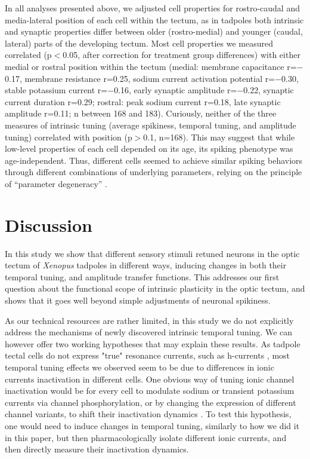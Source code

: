 \documentclass{article}
\begin{document}
In all analyses presented above, we adjusted cell properties for rostro-caudal and media-lateral position of each cell within the tectum, as in tadpoles both intrinsic \citep{hamodi2014} and synaptic properties \citep{wu1996,khakhalin2012} differ between older (rostro-medial) and younger (caudal, lateral) parts of the developing tectum. Most cell properties we measured correlated (p$<$0.05, after correction for treatment group differences) with either medial or rostral position within the tectum (medial: membrane capacitance r=$-$0.17, membrane resistance r=0.25, sodium current activation potential r=$-$0.30, stable potassium current r=$-$0.16, early synaptic amplitude r=$-$0.22, synaptic current duration r=0.29; rostral: peak sodium current r=0.18, late synaptic amplitude r=0.11; n between 168 and 183). Curiously, neither of the three measures of intrinsic tuning (average spikiness, temporal tuning, and amplitude tuning) correlated with position (p$>$0.1, n=168). This may suggest that while low-level properties of each cell depended on its age, its spiking phenotype was age-independent. Thus, different cells seemed to achieve similar spiking behaviors through different combinations of underlying parameters, relying on the principle of “parameter degeneracy” \citep{prinz2004degeneracy,drion2015}.


\section*{Discussion}

In this study we show that different sensory stimuli retuned neurons in the optic tectum of \textit{Xenopus} tadpoles in different ways, inducing changes in both their temporal tuning, and amplitude transfer functions. This addresses our first question about the functional scope of intrinsic plasticity in the optic tectum, and shows that it goes well beyond simple adjustments of neuronal spikiness.

As our technical resources are rather limited, in this study we do not explicitly address the mechanisms of newly discovered intrinsic temporal tuning. We can however offer two working hypotheses that may explain these results. As tadpole tectal cells do not express "true" resonance currents, such as h-currents \citep{ciarleglio2015}, most temporal tuning effects we observed seem to be due to differences in ionic currents inactivation in different cells. One obvious way of tuning ionic channel inactivation would be for every cell to modulate sodium or transient potassium currents via channel phosphorylation, or by changing the expression of different channel variants, to shift their inactivation dynamics \citep{frank2003nachannels,goldwyn2018a_current}. To test this hypothesis, one would need to induce changes in temporal tuning, similarly to how we did it in this paper, but then pharmacologically isolate different ionic currents, and then directly measure their inactivation dynamics.
\end{document}

